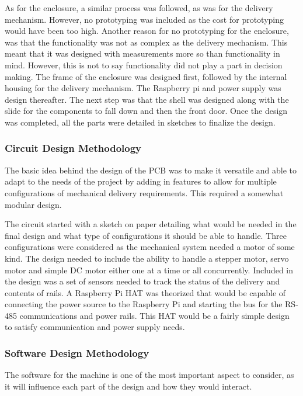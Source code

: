 \documentclass[a4paper,11pt]{article}
\numberwithin{figure}{section}
\numberwithin{table}{section}
\begin{document}
As for the enclosure, a similar process was followed, as was for the delivery mechanism. However, no prototyping was included as the cost for prototyping would have been too high. Another reason for no prototyping for the enclosure, was that the functionality was not as complex as the delivery mechanism. This meant that it was designed with measurements more so than functionality in mind. However, this is not to say functionality did not play a part in decision making. The frame of the enclosure was designed first, followed by the internal housing for the delivery mechanism. The Raspberry pi and power supply was design thereafter. The next step was that the shell was designed along with the slide for the components to fall down and then the front door. Once the design was completed, all the parts were detailed in sketches to finalize the design.

\subsubsection{Circuit Design Methodology}
The basic idea behind the design of the PCB was to make it versatile and able to adapt to the needs of the project by adding in features to allow for multiple configurations of mechanical delivery requirements. This required a somewhat modular design.

The circuit started with a sketch on paper detailing what would be needed in the final design and what type of configurations it should be able to handle. Three configurations were considered as the mechanical system needed a motor of some kind. The design needed to include the ability to handle a stepper motor, servo motor and simple DC motor either one at a time or all concurrently. Included in the design was a set of sensors needed to track the status of the delivery and contents of rails. A Raspberry Pi HAT was theorized that would be capable of connecting the power source to the Raspberry Pi and starting the bus for the RS-485 communications and power rails. This HAT would be a fairly simple design to satisfy communication and power supply needs.



\subsubsection{Software Design Methodology}
The software for the machine is one of the most important aspect to consider, as it will influence each part of the design and how they would interact.
\end{document}
